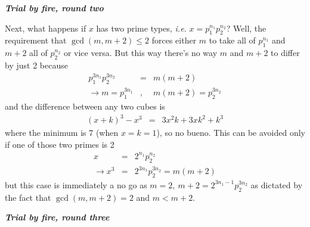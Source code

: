 \documentclass[aps,preprint,preprintnumbers,nofootinbib,showpacs,prd]{revtex4-1}
\newcommand{\ie}{{\it i.e.} }
\newcommand{\nbea}{\begin{eqnarray*}}
\newcommand{\neea}{\end{eqnarray*}}
\begin{document}
\bigskip
\textit{\textbf{Trial by fire, round two}}
\smallskip

Next, what happens if $x$ has two prime types, \ie $x = p_1^{n_1} p_2^{n_2}$? Well, the requirement that $\gcd(m, m+2) \le 2$ forces either $m$ to take all of $p_1^{n_1}$ and $m + 2$ all of $p_2^{n_2}$ or vice versa. But this way there's no way $m$ and $m + 2$ to differ by just 2 because
%
\nbea
p_1^{3n_1} p_2^{3n_2} & = & m(m + 2) \\
\to m = p_1^{3n_1} & ,~ & m(m + 2) = p_2^{3n_2}
\neea
%
and the difference between any two cubes is
%
\nbea
(x + k)^3 - x^3 & = & 3x^2k + 3xk^2 + k^3
\neea
%
where the minimum is 7 (when $x=k=1$), so no bueno. This can be avoided only if one of those two primes is 2
%
\nbea
x & = & 2^{n_1} p_2^{n_2} \\
\to x^3 & = & 2^{3n_1} p_2^{3n_2} = m(m + 2)
\neea
%
but this case is immediately a no go as $m = 2, ~ m + 2 = 2^{3n_1 - 1} p_2^{3n_2}$ as dictated by the fact that $\gcd(m, m+2) = 2$ and $m < m + 2$.

\bigskip
\textit{\textbf{Trial by fire, round three}}
\smallskip
\end{document}
